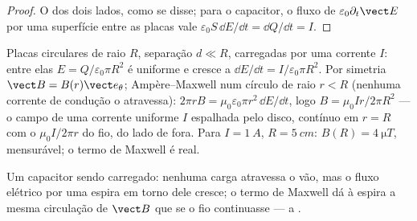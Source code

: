 \begin{proof}
O  dos dois lados, como se disse; para o capacitor, o fluxo de
$\varepsilon_0\partial_t\vect E$ por uma superfície entre as placas vale
$\varepsilon_0S\,\dd E/\dd t = \dd Q/\dd t = I$.
\end{proof}

\begin{example}\label{ex:b2:maxwell-equations:capacitor}
Placas circulares de raio $R$, separação $d \ll R$, carregadas por uma corrente
$I$: entre elas $E = Q/\varepsilon_0\pi R^2$ é uniforme e cresce a $\dd E/
\dd t = I/\varepsilon_0\pi R^2$. Por simetria $\vect B = B(r)\vect e_\theta$; Ampère--Maxwell
num círculo de raio $r < R$ (nenhuma corrente de condução o atravessa): $2\pi rB
= \mu_0\varepsilon_0\pi r^2\,\dd E/\dd t$, logo $B = \mu_0Ir/2\pi R^2$ --- o campo de uma
corrente uniforme $I$ espalhada pelo disco, contínuo em $r = R$ com o
$\mu_0I/2\pi r$ do fio, do lado de fora. Para $I = \qty{1}{A}$, $R = \qty{5}{cm}$: $B(R) =
\qty{4}{\micro T}$, mensurável; o termo de Maxwell é real.
\end{example}

\begin{omfigure}

{\small Um capacitor sendo carregado: nenhuma carga atravessa o vão, mas o
fluxo elétrico por uma espira em torno dele cresce; o termo de Maxwell dá à
espira a mesma circulação de $\vect B$ que se o fio continuasse --- a
.}
\end{omfigure}

